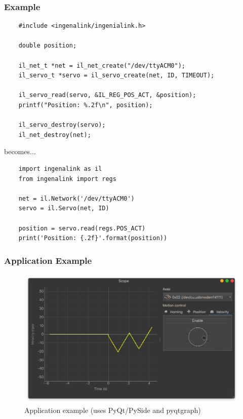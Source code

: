 \documentclass{beamer}
\begin{document}
\begin{frame}[fragile]
  \frametitle{Example}

  \begin{verbatim}
    #include <ingenalink/ingenialink.h>

    double position;

    il_net_t *net = il_net_create("/dev/ttyACM0");
    il_servo_t *servo = il_servo_create(net, ID, TIMEOUT);

    il_servo_read(servo, &IL_REG_POS_ACT, &position);
    printf("Position: %.2f\n", position);

    il_servo_destroy(servo);
    il_net_destroy(net);
  \end{verbatim}

  becomes...

  \begin{verbatim}
    import ingenalink as il
    from ingenalink import regs

    net = il.Network('/dev/ttyACM0')
    servo = il.Servo(net, ID)

    position = servo.read(regs.POS_ACT)
    print('Position: {.2f}'.format(position))
  \end{verbatim}
\end{frame}

\begin{frame}
  \frametitle{Application Example}

  \begin{figure}
    \centering
    \includegraphics[scale=0.3]{example-scope.png}
    \caption{Application example (uses PyQt/PySide and pyqtgraph)}
  \end{figure}
\end{frame}
\end{document}
